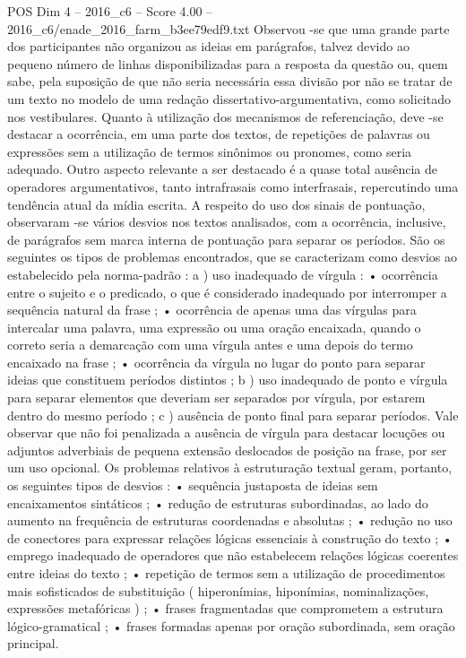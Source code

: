 \begin{textsample}{POS Dim 4 – 2016\_c6 – Score 4.00 – 2016\_c6/enade\_2016\_farm\_b3ee79edf9.txt}
Observou -se que uma grande parte dos participantes não organizou as ideias em parágrafos, talvez devido ao pequeno número de linhas disponibilizadas para a resposta da questão ou, quem sabe, pela suposição de que não seria necessária essa divisão por não se tratar de um texto no modelo de uma redação dissertativo-argumentativa, como solicitado nos vestibulares.
Quanto à utilização dos mecanismos de referenciação, deve -se destacar a ocorrência, em uma parte dos textos, de repetições de palavras ou expressões sem a utilização de termos sinônimos ou pronomes, como seria adequado.
Outro aspecto relevante a ser destacado é a quase total ausência de operadores argumentativos, tanto intrafrasais como interfrasais, repercutindo uma tendência atual da mídia escrita.
A respeito do uso dos sinais de pontuação, observaram -se vários desvios nos textos analisados, com a ocorrência, inclusive, de parágrafos sem marca interna de pontuação para separar os períodos.
São os seguintes os tipos de problemas encontrados, que se caracterizam como desvios ao estabelecido pela norma-padrão : a ) uso inadequado de vírgula : • ocorrência entre o sujeito e o predicado, o que é considerado inadequado por interromper a sequência natural da frase ; • ocorrência de apenas uma das vírgulas para intercalar uma palavra, uma expressão ou uma oração encaixada, quando o correto seria a demarcação com uma vírgula antes e uma depois do termo encaixado na frase ; • ocorrência da vírgula no lugar do ponto para separar ideias que constituem períodos distintos ; b ) uso inadequado de ponto e vírgula para separar elementos que deveriam ser separados por vírgula, por estarem dentro do mesmo período ; c ) ausência de ponto final para separar períodos.
Vale observar que não foi penalizada a ausência de vírgula para destacar locuções ou adjuntos adverbiais de pequena extensão deslocados de posição na frase, por ser um uso opcional.
Os problemas relativos à estruturação textual geram, portanto, os seguintes tipos de desvios : • sequência justaposta de ideias sem encaixamentos sintáticos ; • redução de estruturas subordinadas, ao lado do aumento na frequência de estruturas coordenadas e absolutas ; • redução no uso de conectores para expressar relações lógicas essenciais à construção do texto ; • emprego inadequado de operadores que não estabelecem relações lógicas coerentes entre ideias do texto ; • repetição de termos sem a utilização de procedimentos mais sofisticados de substituição ( hiperonímias, hiponímias, nominalizações, expressões metafóricas ) ; • frases fragmentadas que comprometem a estrutura lógico-gramatical ; • frases formadas apenas por oração subordinada, sem oração principal.

\end{textsample}
